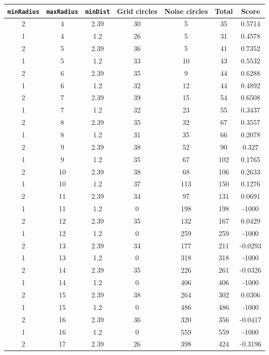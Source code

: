 \documentclass[letterpaper, 12pt]{article}
\begin{document}
\begin{longtable}{|c|c|c|c|c|c|c|}
\hline
\textbf{\texttt{minRadius}} & \textbf{\texttt{maxRadius}} & \textbf{\texttt{minDist}} & \textbf{Grid circles} & \textbf{Noise circles} & \textbf{Total} & \textbf{Score} \\
\hline
2 & 4 & 2.39 & 30 & 5 & 35 & 0.5714 \\
\hline
1 & 4 & 1.2 & 26 & 5 & 31 & 0.4578 \\
\hline
2 & 5 & 2.39 & 36 & 5 & 41 & 0.7352 \\
\hline
1 & 5 & 1.2 & 33 & 10 & 43 & 0.5532 \\
\hline
2 & 6 & 2.39 & 35 & 9 & 44 & 0.6288 \\
\hline
1 & 6 & 1.2 & 32 & 12 & 44 & 0.4892 \\
\hline
2 & 7 & 2.39 & 39 & 15 & 54 & 0.6508 \\
\hline
1 & 7 & 1.2 & 32 & 23 & 55 & 0.3437 \\
\hline
2 & 8 & 2.39 & 35 & 32 & 67 & 0.3557 \\
\hline
1 & 8 & 1.2 & 31 & 35 & 66 & 0.2078 \\
\hline
2 & 9 & 2.39 & 38 & 52 & 90 & 0.327 \\
\hline
1 & 9 & 1.2 & 35 & 67 & 102 & 0.1765 \\
\hline
2 & 10 & 2.39 & 38 & 68 & 106 & 0.2633 \\
\hline
1 & 10 & 1.2 & 37 & 113 & 150 & 0.1276 \\
\hline
2 & 11 & 2.39 & 34 & 97 & 131 & 0.0691 \\
\hline
1 & 11 & 1.2 & 0 & 198 & 198 & -1000 \\
\hline
2 & 12 & 2.39 & 35 & 132 & 167 & 0.0429 \\
\hline
1 & 12 & 1.2 & 0 & 259 & 259 & -1000 \\
\hline
2 & 13 & 2.39 & 34 & 177 & 211 & -0.0293 \\
\hline
1 & 13 & 1.2 & 0 & 318 & 318 & -1000 \\
\hline
2 & 14 & 2.39 & 35 & 226 & 261 & -0.0326 \\
\hline
1 & 14 & 1.2 & 0 & 406 & 406 & -1000 \\
\hline
2 & 15 & 2.39 & 38 & 264 & 302 & 0.0306 \\
\hline
1 & 15 & 1.2 & 0 & 486 & 486 & -1000 \\
\hline
2 & 16 & 2.39 & 36 & 320 & 356 & -0.0417 \\
\hline
1 & 16 & 1.2 & 0 & 559 & 559 & -1000 \\
\hline
2 & 17 & 2.39 & 26 & 398 & 424 & -0.3196 \\

\end{longtable}
\end{document}
